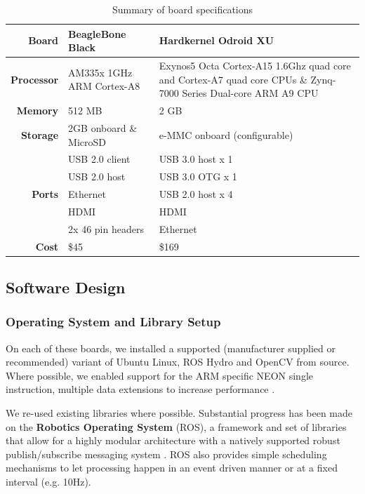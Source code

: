 \documentclass{acm_proc_article-sp}
\begin{document}
\begin{table}[t]
  \centering
  \caption{Summary of board specifications}
    \begin{tabular}{r p{5.5cm} p{5.5cm} }
    \toprule
    \textbf{Board} & \textbf{BeagleBone Black} & \textbf{Hardkernel Odroid XU} \\
    \midrule
    \textbf{Processor} & AM335x 1GHz ARM Cortex-A8 & Exynos5 Octa Cortex-A15 1.6Ghz quad core and Cortex-A7 quad core CPUs \& Zynq-7000 Series Dual-core ARM A9 CPU  \\
    \textbf{Memory} & 512 MB & 2 GB  \\
    \textbf{Storage} & 2GB onboard \& MicroSD & e-MMC onboard (configurable) \\
    \multirow{5}[0]{*}{\textbf{Ports}} & USB 2.0 client & USB 3.0 host x 1 \\
          & USB 2.0 host & USB 3.0 OTG x 1  \\
          & Ethernet & USB 2.0 host x 4  \\
          & HDMI  & HDMI   \\
          & 2x 46 pin headers & Ethernet \\
    \textbf{Cost} & \$45 & \$169  \\
    \bottomrule
    \end{tabular}%
  \label{tab:board-specs}%
\end{table}%


\subsection{Software Design}

\subsubsection{Operating System and Library Setup \label{sec:roscopter}}
On each of these boards, we installed a supported (manufacturer supplied or recommended) variant of Ubuntu Linux, ROS Hydro and OpenCV from source. Where possible, we enabled support for the ARM specific NEON single instruction, multiple data  extensions to increase performance \cite{stotzer2013openmp}.

We re-used existing libraries where possible. Substantial progress has been made on the \textbf{Robotics Operating System} (ROS), a framework and set of libraries that allow for a highly modular architecture with a natively supported robust publish/subscribe messaging system \cite{quigley2009ros}.  ROS also provides simple scheduling mechanisms to let processing happen in an event driven manner or at a fixed interval (e.g. 10Hz).
\end{document}

